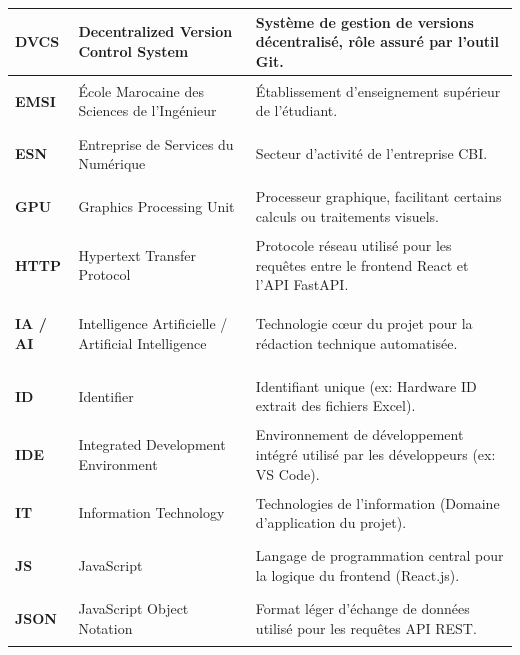 \documentclass[12pt, a4paper]{report}
\begin{document}
\begin{longtable}{|p{2.5cm}|p{5.5cm}|p{\dimexpr\textwidth-8.8cm}|}
    \hypertarget{acr:7}{}\textbf{DVCS} & Decentralized Version Control System & Système de gestion de versions décentralisé, rôle assuré par l'outil Git. \\ \hline
    
    \hypertarget{acr:8}{}\textbf{EMSI} & École Marocaine des Sciences de l'Ingénieur & Établissement d'enseignement supérieur de l'étudiant. \\ \hline
    
    \hypertarget{acr:9}{}\textbf{ESN} & Entreprise de Services du Numérique & Secteur d'activité de l'entreprise CBI. \\ \hline
    
    \hypertarget{acr:10}{}\textbf{GPU} & Graphics Processing Unit & Processeur graphique, facilitant certains calculs ou traitements visuels. \\ \hline
    
    \hypertarget{acr:11}{}\textbf{HTTP} & Hypertext Transfer Protocol & Protocole réseau utilisé pour les requêtes entre le frontend React et l'API FastAPI. \\ \hline
    
    \hypertarget{acr:12}{}\textbf{IA / AI} & Intelligence Artificielle / Artificial Intelligence & Technologie cœur du projet pour la rédaction technique automatisée. \\ \hline
    
    \hypertarget{acr:13}{}\textbf{ID} & Identifier & Identifiant unique (ex: Hardware ID extrait des fichiers Excel). \\ \hline
    
    \hypertarget{acr:14}{}\textbf{IDE} & Integrated Development Environment & Environnement de développement intégré utilisé par les développeurs (ex: VS Code). \\ \hline
    
    \hypertarget{acr:15}{}\textbf{IT} & Information Technology & Technologies de l'information (Domaine d'application du projet). \\ \hline
    
    \hypertarget{acr:16}{}\textbf{JS} & JavaScript & Langage de programmation central pour la logique du frontend (React.js). \\ \hline
    
    \hypertarget{acr:17}{}\textbf{JSON} & JavaScript Object Notation & Format léger d'échange de données utilisé pour les requêtes API REST. \\ \hline
    

\end{longtable}
\end{document}
